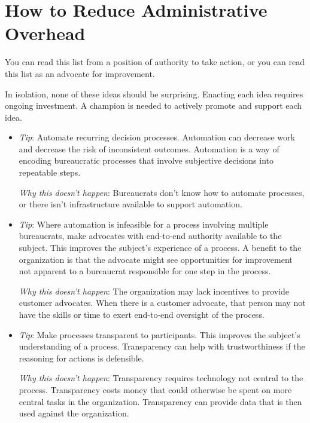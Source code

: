 \section{How to Reduce Administrative Overhead\label{sec:reducing-overhead}}

You can read this list from a position of authority to take action, or you can read this list as an advocate for improvement. 

In isolation, none of these ideas should be surprising. Enacting each idea requires ongoing investment. A champion is needed to actively promote and support each idea.
\begin{itemize}
    \item \textit{Tip}: Automate recurring decision processes. Automation can decrease work and decrease the risk of inconsistent outcomes. Automation is a way of encoding bureaucratic processes that involve subjective decisions into repeatable steps.
    
    \textit{Why this doesn't happen}: Bureaucrats don't know how to automate processes, or there isn't infrastructure available to support automation. 

    \item \textit{Tip}: Where automation is infeasible for a process involving multiple bureaucrats, make advocates with end-to-end authority available to the subject. 
This improves the subject's experience of a process. A benefit to the organization is that the advocate might see opportunities for improvement not apparent to a bureaucrat responsible for one step in the process.

    \textit{Why this doesn't happen}: The organization may lack incentives to provide customer advocates. When there is a customer advocate, that person may not have the skills or time to exert end-to-end oversight of the process.

    \item \textit{Tip}: Make processes transparent to participants. 
This improves the subject's understanding of a process. Transparency can help with trustworthiness if the reasoning for actions is defensible.

    \textit{Why this doesn't happen}: Transparency requires technology not central to the process. Transparency costs money that could otherwise be spent on more central tasks in the organization. Transparency can provide data that is then used against the organization. 


\end{itemize}
